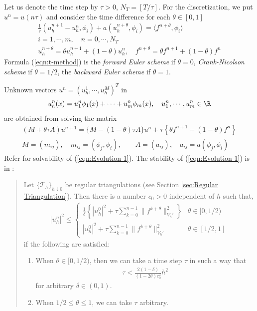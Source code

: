 \documentclass[a4paper,twoside,12pt]{book}
\def\refSec#1{Section \ref{sec:#1}}
\begin{document}
Let us denote the time step by $\tau>0$, $N_T=[T/\tau]$.
For the discretization, we put $u^n = u(n\tau)$
and consider the time difference for each $\theta\in [0,1]$
\begin{eqnarray}
\label{eqn:t-method}
\frac{1}{\tau}\left( u_h^{n+1}-u_h^n,\phi_i\right)
+a\left( u_h^{n+\theta},\phi_i\right)=\langle f^{n+\theta},\phi_i\rangle\\
i=1,\cdots, m,\quad n=0,\cdots, N_T\nonumber\\
u_h^{n+\theta}=\theta u_h^{n+1}+(1-\theta)u_h^n,\quad
f^{n+\theta}=\theta f^{n+1}+(1-\theta)f^n\nonumber
\end{eqnarray}
Formula (\ref{eqn:t-method}) is the \emph{forward Euler scheme} if
$\theta=0$, \emph{Crank-Nicolson scheme} if $\theta=1/2$,
the \emph{backward Euler scheme} if $\theta=1$.

Unknown vectors $u^n=(u_h^1,\cdots,u_h^M)^T$ in
\[
u_h^n(x)=u^n_1\phi_1(x)+\cdots+u^n_m\phi_m(x),\quad u^n_1,\cdots,u^n_m\in \R
\]
are obtained from solving the matrix
\begin{eqnarray}
\label{eqn:Evolution-1}
(M+\theta\tau A)u^{n+1}=\{M-(1-\theta)\tau A\}u^n
+\tau\left\{\theta f^{n+1}+(1-\theta)f^n\right\}\\
M=(m_{ij}),\quad m_{ij}=(\phi_j,\phi_i),\qquad
A=(a_{ij}),\quad a_{ij}=a(\phi_j,\phi_i)\nonumber
\end{eqnarray}
Refer \cite[pp.70--75]{TA94} for solvability of (\ref{eqn:Evolution-1}).
The stability of (\ref{eqn:Evolution-1}) is in \cite[Theorem 2.13]{TA94}:
\begin{quotation}
Let $\{\mathcal{T}_h\}_{h\downarrow 0}$ be regular triangulations
(see \refSec{Regular Triangulation}).
Then there is a number $c_0>0$ independent of $h$ such that,
\begin{eqnarray}
|u_h^n|^2\le
\left\{
\begin{array}{lr}
\frac{1}{\delta}\left\{
|u^0_h|^2+\tau \sum_{k=0}^{n-1}\|f^{k+\theta}\|^2_{V_h'}
\right\}&\theta\in [0,1/2)\\
|u^0_h|^2+\tau \sum_{k=0}^{n-1}\|f^{k+\theta}\|^2_{V_h'}&\theta\in [1/2,1]
\end{array}
\right.
\end{eqnarray}
if the following are satisfied:
\begin{enumerate}
  \item When $\theta\in [0,1/2)$, then we can take a time step $\tau$ in
such a way that
\begin{eqnarray}
\tau <\frac{2(1-\delta)}{(1-2\theta)c_0^2}h^2
\end{eqnarray}
for arbitrary $\delta\in (0,1)$.
  \item When $1/2\le \theta\le 1$, we can take $\tau$ arbitrary.
\end{enumerate}
\end{quotation}
\end{document}
